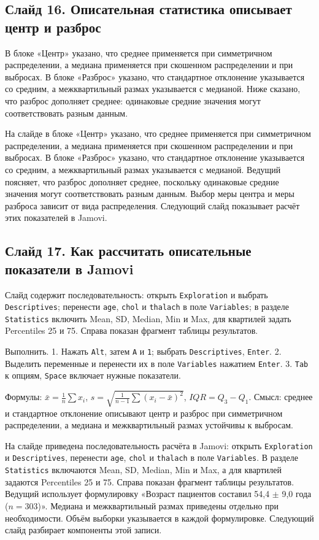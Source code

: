 \documentclass[11pt,a4paper]{article}
\begin{document}
\subsection*{Слайд 16. Описательная статистика описывает центр и разброс}
\begin{onslide}
В блоке «Центр» указано, что среднее применяется при симметричном распределении, а медиана применяется при скошенном распределении и при выбросах. В блоке «Разброс» указано, что стандартное отклонение указывается со средним, а межквартильный размах указывается с медианой. Ниже сказано, что разброс дополняет среднее: одинаковые средние значения могут соответствовать разным данным.
\end{onslide}
На слайде в блоке «Центр» указано, что среднее применяется при симметричном распределении, а медиана применяется при скошенном распределении и при выбросах. В блоке «Разброс» указано, что стандартное отклонение указывается со средним, а межквартильный размах указывается с медианой. Ведущий поясняет, что разброс дополняет среднее, поскольку одинаковые средние значения могут соответствовать разным данным. Выбор меры центра и меры разброса зависит от вида распределения. Следующий слайд показывает расчёт этих показателей в Jamovi.

\subsection*{Слайд 17. Как рассчитать описательные показатели в Jamovi}
\begin{onslide}
Слайд содержит последовательность: открыть \texttt{Exploration} и выбрать \texttt{Descriptives}; перенести \texttt{age}, \texttt{chol} и \texttt{thalach} в поле \texttt{Variables}; в разделе \texttt{Statistics} включить Mean, SD, Median, Min и Max, для квартилей задать Percentiles 25 и 75. Справа показан фрагмент таблицы результатов.
\end{onslide}
\begin{jamovi}
Выполнить. 1. Нажать \texttt{Alt}, затем \texttt{A} и \texttt{1}; выбрать \texttt{Descriptives}, \texttt{Enter}. 2. Выделить переменные и перенести их в поле \texttt{Variables} нажатием \texttt{Enter}. 3. \texttt{Tab} к опциям, \texttt{Space} включает нужные показатели.
\par Формулы: $\bar{x}=\frac{1}{n}\sum x_i$, $s=\sqrt{\frac{1}{n-1}\sum(x_i-\bar{x})^2}$, $IQR=Q_3-Q_1$. Смысл: среднее и стандартное отклонение описывают центр и разброс при симметричном распределении, а медиана и межквартильный размах устойчивы к выбросам.
\end{jamovi}
На слайде приведена последовательность расчёта в Jamovi: открыть \texttt{Exploration} и \texttt{Descriptives}, перенести \texttt{age}, \texttt{chol} и \texttt{thalach} в поле \texttt{Variables}. В разделе \texttt{Statistics} включаются Mean, SD, Median, Min и Max, а для квартилей задаются Percentiles 25 и 75. Справа показан фрагмент таблицы результатов. Ведущий использует формулировку «Возраст пациентов составил 54,4 $\pm$ 9,0 года ($n = 303$)». Медиана и межквартильный размах приведены отдельно при необходимости. Объём выборки указывается в каждой формулировке. Следующий слайд разбирает компоненты этой записи.
\end{document}
